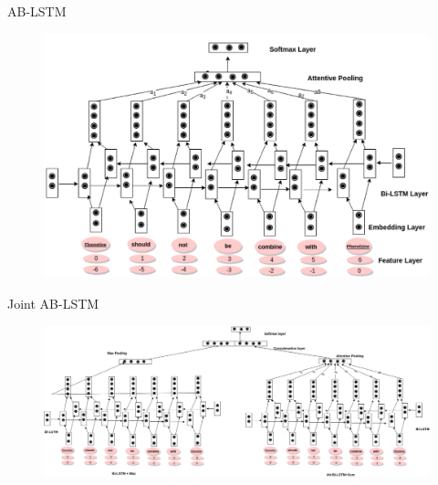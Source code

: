 \documentclass[xcolor={dvipsnames}]{beamer}
\begin{document}
\begin{frame}{\insertsubsection}

\begin{exampleblock}{AB-LSTM}
\begin{figure}[ht]
\centering
\includegraphics[scale=0.27]{fig2.png}
\end{figure}
\end{exampleblock}

\end{frame}

\begin{frame}{\insertsubsection}

\begin{exampleblock}{Joint AB-LSTM}
\begin{figure}[ht]
\centering
\includegraphics[scale=0.195]{fig3.png}
\end{figure}
\end{exampleblock}

\end{frame}
\end{document}
